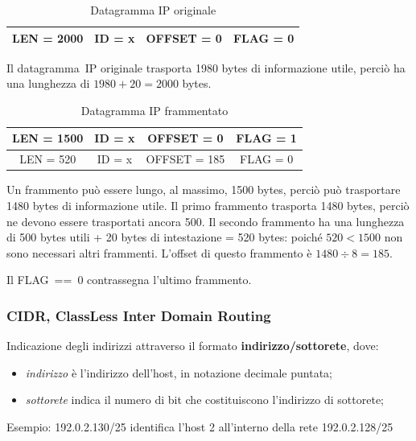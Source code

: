 \documentclass[12pt,a4paper]{article}
\begin{document}
\begin{table}[H]
\centering
\begin{tabular}{| c | c | c | c |}\hline
LEN = 2000  & ID = x  & OFFSET = 0  & FLAG = 0\\ \hline
\end{tabular}
\caption{Datagramma IP originale}
\end{table}
Il datagramma~IP originale trasporta 1980 bytes di informazione utile,
perciò ha una lunghezza di $1980 + 20 = 2000$ bytes.

\begin{table}[H]
\centering
\begin{tabular}{| c | c | c | c |}\hline
LEN = 1500  & ID = x  & OFFSET = 0  & FLAG = 1\\ \hline
LEN = 520   & ID = x  & OFFSET = 185  & FLAG = 0\\ \hline
\end{tabular}
\caption{Datagramma IP frammentato}
\end{table}

Un frammento può essere lungo, al massimo, 1500 bytes, perciò può
trasportare 1480 bytes di informazione utile.
Il primo frammento trasporta 1480 bytes, perciò ne devono essere
trasportati ancora 500.
Il secondo frammento ha una lunghezza di 500 bytes utili + 20 bytes di
intestazione = 520 bytes: poiché $520 < 1500$ non sono necessari altri
frammenti. L'offset di questo frammento è $1480 \div 8 = 185$.

Il FLAG~==~0 contrassegna l'ultimo frammento.

\subsubsection{CIDR, ClassLess Inter Domain Routing}
Indicazione degli indirizzi attraverso il formato
\textbf{indirizzo/sottorete}, dove:
\begin{itemize}
  \item \textit{indirizzo} è l'indirizzo dell'host, in notazione
    decimale puntata;
  \item \textit{sottorete} indica il numero di bit che costituiscono
    l'indirizzo di sottorete;
\end{itemize}
Esempio:
  192.0.2.130/25 identifica l'host 2 all'interno della rete
  192.0.2.128/25
\end{document}
